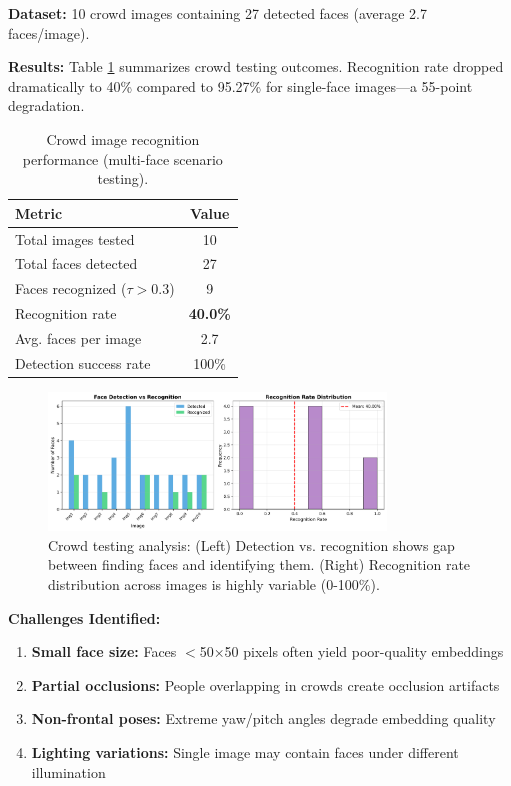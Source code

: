 \documentclass[11pt,a4paper]{article}
\begin{document}
\textbf{Dataset:} 10 crowd images containing 27 detected faces (average 2.7 faces/image).

\textbf{Results:} Table \ref{tab:crowd} summarizes crowd testing outcomes. Recognition rate dropped dramatically to 40\% compared to 95.27\% for single-face images—a 55-point degradation.

\begin{table}[H]
\centering
\caption{Crowd image recognition performance (multi-face scenario testing).}
\label{tab:crowd}
\begin{tabular}{@{}lc@{}}
\toprule
\textbf{Metric} & \textbf{Value} \\ \midrule
Total images tested & 10 \\
Total faces detected & 27 \\
Faces recognized ($\tau > 0.3$) & 9 \\
Recognition rate & \textbf{40.0\%} \\
Avg. faces per image & 2.7 \\
Detection success rate & 100\% \\ \bottomrule
\end{tabular}
\end{table}

\begin{figure}[H]
    \centering
    \includegraphics[width=0.8\textwidth]{runs/crowd_analysis.png}
    \caption{Crowd testing analysis: (Left) Detection vs. recognition shows gap between finding faces and identifying them. (Right) Recognition rate distribution across images is highly variable (0-100\%).}
    \label{fig:crowd}
\end{figure}

\textbf{Challenges Identified:}
\begin{enumerate}
    \item \textbf{Small face size:} Faces $<$50×50 pixels often yield poor-quality embeddings
    \item \textbf{Partial occlusions:} People overlapping in crowds create occlusion artifacts
    \item \textbf{Non-frontal poses:} Extreme yaw/pitch angles degrade embedding quality
    \item \textbf{Lighting variations:} Single image may contain faces under different illumination
\end{enumerate}
\end{document}
